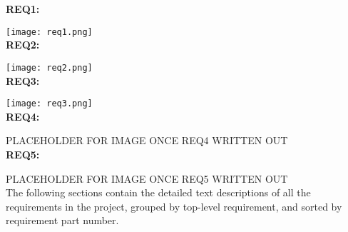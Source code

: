 \textbf{REQ1:}

\texttt{[image: req1.png]}\\

\textbf{REQ2:}

\texttt{[image: req2.png]}\\

\textbf{REQ3:}

\texttt{[image: req3.png]}\\

\textbf{REQ4:}

PLACEHOLDER FOR IMAGE ONCE REQ4 WRITTEN OUT\\

\textbf{REQ5:}

PLACEHOLDER FOR IMAGE ONCE REQ5 WRITTEN OUT\\

The following sections contain the detailed text descriptions of all the requirements in the project, grouped by top-level requirement, and sorted by requirement part number.










